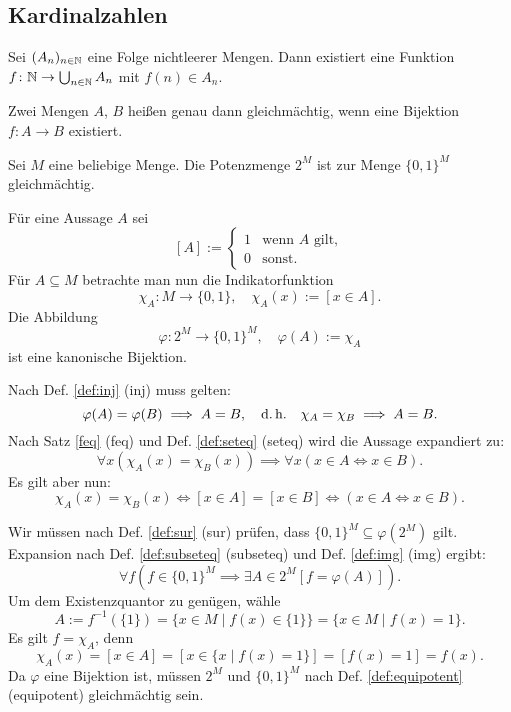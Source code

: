\newpage
\subsection{Kardinalzahlen}
\begin{Satz}\label{acc}%
Sei $(A_n)_{n\in\mathbb N}$ eine Folge nichtleerer Mengen.
Dann existiert eine Funktion $f\colon\mathbb N\to\bigcup_{n\in\mathbb N} A_n$
mit $f(n)\in A_n$.
\end{Satz}

\begin{Definition}%
\label{def:equipotent}
Zwei Mengen $A$, $B$ heißen genau dann gleichmächtig, wenn
eine Bijektion $f\colon A\to B$ existiert.
\end{Definition}

\begin{Satz}
Sei $M$ eine beliebige Menge. Die Potenzmenge $2^M$ ist zur
Menge $\{0,1\}^M$ gleichmächtig.
\end{Satz}

\begin{Beweis}
Für eine Aussage $A$ sei
\[[A] := \begin{cases}
1&\text{wenn $A$ gilt},\\
0&\text{sonst}.
\end{cases}\]
Für $A\subseteq M$ betrachte man nun die
Indikatorfunktion
\[\chi_A\colon M\to\{0,1\},\quad \chi_A(x):=[x\in A].\]
Die Abbildung
\[\varphi\colon 2^M\to \{0,1\}^M,\quad \varphi(A):=\chi_A\]
ist eine kanonische Bijektion.

Nach Def. \ref{def:inj} (inj) muss gelten:
\[\varphi(A)=\varphi(B)\implies A=B,\quad\text{d.\,h.}\quad
\chi_A=\chi_B \implies A=B.\]
Nach Satz \ref{feq} (feq) und Def. \ref{def:seteq} (seteq)
wird die Aussage expandiert zu:
\[\forall x(\chi_A(x)=\chi_B(x))\implies \forall x(x\in A\iff x\in B).\]
Es gilt aber nun:
\[\chi_A(x)=\chi_B(x)\iff [x\in A]=[x\in B] \iff (x\in A\iff x\in B).\]
\end{Beweis}
 Wir müssen nach Def. \ref{def:sur} (sur)
prüfen, dass $\{0,1\}^M\subseteq \varphi(2^M)$ gilt.
Expansion nach Def. \ref{def:subseteq} (subseteq) und
Def. \ref{def:img} (img)
ergibt:
\[\forall f(f\in \{0,1\}^M\implies\exists A{\in}2^M[f=\varphi(A)]).\]
Um dem Existenzquantor zu genügen, wähle
\[A := f^{-1}(\{1\}) = \{x\in M\mid f(x)\in \{1\}\} = \{x\in M\mid f(x)=1\}.\]
Es gilt $f=\chi_A$, denn
\[\chi_A(x) = [x\in A] = [x\in\{x\mid f(x)=1\}] = [f(x)=1] = f(x).\]
Da $\varphi$ eine Bijektion ist, müssen $2^M$ und $\{0,1\}^M$
nach Def. \ref{def:equipotent} (equipotent) gleichmächtig
sein.\,\qedsymbol

